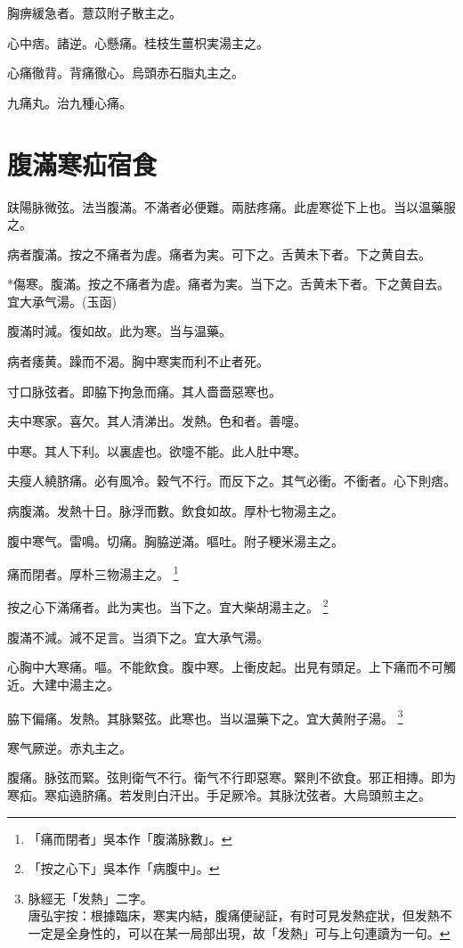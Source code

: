\documentclass[12pt,twoside,UTF8,b5paper]{ctexbook}
\begin{document}
胸痹緩急者。薏苡附子散主之。

心中痞。諸逆。心懸痛。桂枝生薑枳実湯主之。

心痛徹背。背痛徹心。烏頭赤石脂丸主之。

九痛丸。治九種心痛。

\chapter{腹滿寒疝宿食}

趺陽脉微弦。法当腹滿。不滿者必便難。兩胠疼痛。此虗寒從下上也。当以温藥服之。

病者腹滿。按之不痛{者}为虗。痛者为実。可下之。舌黄未下者。下之黄自去。

*傷寒。腹滿。按之不痛者为虗。痛者为実。当下之。舌黄未下者。下之黄自去。宜大承气湯。(玉函)

腹滿时減。復如故。此为寒。当与温藥。

病者痿黄。躁而不渴。胸中寒実而利不止者死。

寸口脉弦者。即脇下拘急而痛。其人嗇嗇惡寒也。

夫中寒家。喜欠。其人清涕出。发熱。色和者。善嚏。

中寒。其人下利。以裏虗也。欲嚏不能。此人肚中寒。

夫瘦人繞脐痛。必有風冷。穀气不行。而反下之。其气必衝。不衝者。心下則痞。

病腹滿。发熱十日。脉浮而數。飲食如故。厚朴七物湯主之。

腹中寒气。雷鳴。切痛。胸脇逆滿。嘔吐。附子粳米湯主之。

痛而閉者。厚朴三物湯主之。
	\footnote{「痛而閉者」吳本作「腹滿脉數」。}

按之心下滿痛者。此为実也。当下之。宜大柴胡湯主之。
	\footnote{「按之心下」吳本作「病腹中」。}

腹滿不減。減不足言。当須下之。宜大承气湯。

心胸中大寒痛。嘔。不能飲食。腹中寒。上衝皮起。出見有頭足。上下痛而不可觸近。大建中湯主之。

脇下偏痛。{发熱。}其脉緊弦。此寒也。{当}以温藥下之。宜大黄附子湯。
	\footnote{脉經无「发熱」二字。\\唐弘宇按：根據臨床，寒実内結，腹痛便祕証，有时可見发熱症狀，但发熱不一定是全身性的，可以在某一局部出現，故「发熱」可与上句連讀为一句。}

寒气厥逆。赤丸主之。

腹痛。脉弦而緊。弦則衛气不行。{衛气不行}即惡寒。緊則不欲食。邪正相摶。即为寒疝。寒疝遶脐痛。若发則白汗出。手足厥冷。其脉沈弦者。大烏頭煎主之。
\end{document}
